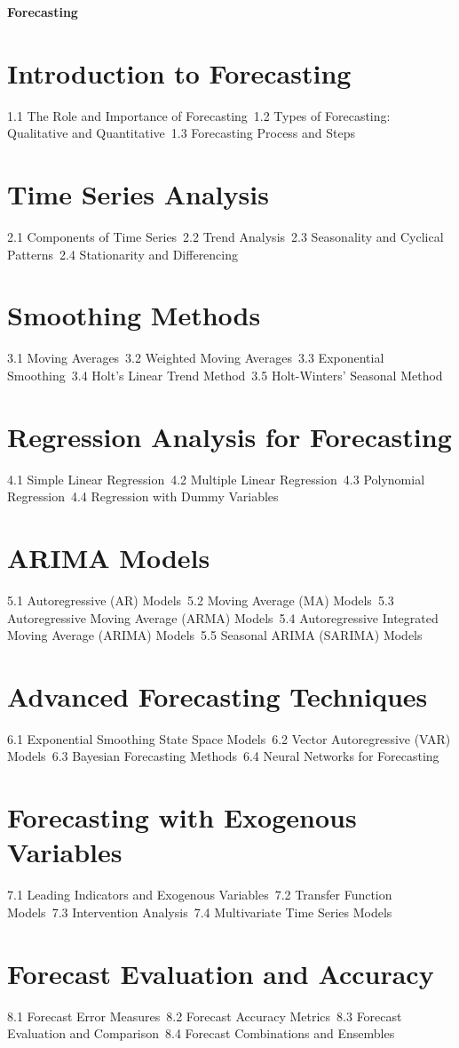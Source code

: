 {\LARGE \bf{Forecasting}}
\section{Introduction to Forecasting}
1.1 The Role and Importance of Forecasting\
1.2 Types of Forecasting: Qualitative and Quantitative\
1.3 Forecasting Process and Steps\
\section{Time Series Analysis}
2.1 Components of Time Series\
2.2 Trend Analysis\
2.3 Seasonality and Cyclical Patterns\
2.4 Stationarity and Differencing\
\section{Smoothing Methods}
3.1 Moving Averages\
3.2 Weighted Moving Averages\
3.3 Exponential Smoothing\
3.4 Holt's Linear Trend Method\
3.5 Holt-Winters' Seasonal Method\
\section{Regression Analysis for Forecasting}
4.1 Simple Linear Regression\
4.2 Multiple Linear Regression\
4.3 Polynomial Regression\
4.4 Regression with Dummy Variables\
\section{ARIMA Models}
5.1 Autoregressive (AR) Models\
5.2 Moving Average (MA) Models\
5.3 Autoregressive Moving Average (ARMA) Models\
5.4 Autoregressive Integrated Moving Average (ARIMA) Models\
5.5 Seasonal ARIMA (SARIMA) Models\
\section{Advanced Forecasting Techniques}
6.1 Exponential Smoothing State Space Models\
6.2 Vector Autoregressive (VAR) Models\
6.3 Bayesian Forecasting Methods\
6.4 Neural Networks for Forecasting\
\section{Forecasting with Exogenous Variables}
7.1 Leading Indicators and Exogenous Variables\
7.2 Transfer Function Models\
7.3 Intervention Analysis\
7.4 Multivariate Time Series Models\
\section{Forecast Evaluation and Accuracy}
8.1 Forecast Error Measures\
8.2 Forecast Accuracy Metrics\
8.3 Forecast Evaluation and Comparison\
8.4 Forecast Combinations and Ensembles\
